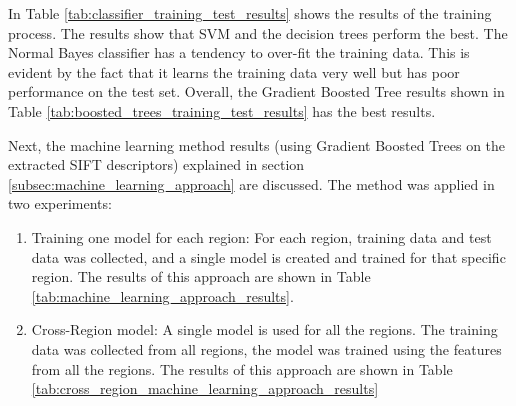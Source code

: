 In Table \ref{tab:classifier_training_test_results} shows the results of the training process. The results show that SVM and the decision trees perform the best. The Normal Bayes classifier has a tendency to over-fit the training data. This is evident by the fact that it learns the training data very well but has poor performance on the test set. Overall, the Gradient Boosted Tree results shown in Table \ref{tab:boosted_trees_training_test_results} has the best results.

Next, the machine learning method results (using Gradient Boosted Trees on the extracted SIFT descriptors) explained in section \ref{subsec:machine_learning_approach} are discussed. The method was applied in two experiments: 

\begin{enumerate}
	\item Training one model for each region: For each region, training data and test data was collected, and a single model is created and trained for that specific region. The results of this approach are shown in Table \ref{tab:machine_learning_approach_results}.
	\item Cross-Region model: A single model is used for all the regions. The training data was collected from all regions, the model was trained using the features from all the regions. The results of this approach are shown in Table \ref{tab:cross_region_machine_learning_approach_results}
\end{enumerate}

